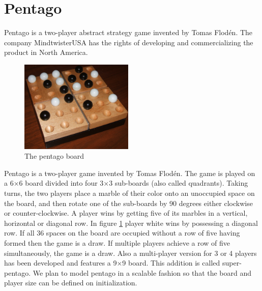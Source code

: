 \section{Pentago}
\label{Pentago}
Pentago is a two-player abstract strategy game invented by Tomas Flodén. 
The company MindtwisterUSA \cite{MindTwisterUSA} has the rights of developing and commercializing the product in North America. %


\begin{figure}
  \begin{center}
    \includegraphics[width=0.48\textwidth]{Images/Pentago-Game-Winning-Position.jpg}
  \end{center}
  \caption{The pentago board}
  \label{fig:boardpic}
\end{figure}

\vspace{6pt}

Pentago is a two-player game invented by Tomas Flodén. 
The game is played on a 6×6 board divided into four 3×3 sub-boards (also called quadrants). 
Taking turns, the two players place a marble of their color onto an unoccupied space on the board, and then rotate one of the sub-boards by 90 degrees either clockwise or counter-clockwise. 
A player wins by getting five of its marbles in a vertical, horizontal or diagonal row. 
In figure \ref{fig:boardpic} player white wins by possessing a diagonal row. 
If all 36 spaces on the board are occupied without a row of five having formed then the game is a draw.
If multiple players achieve a row of five simultaneously, the game is a draw.
Also a multi-player version for 3 or 4 players has been developed and features a 9×9 board. 
This addition is called super-pentago. 
We plan to model pentago in a scalable fashion so that the board and player size can be defined on initialization.
